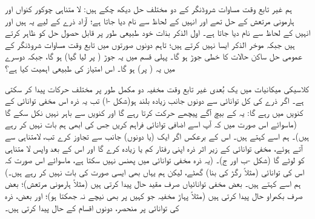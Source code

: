  ہم غیر تابع وقت مساوات شروڈنگر کے دو مختلف حل دیکھ چکے ہیں: لا متناہی چوکور کنواں اور ہارمونی مرتعش کے حل  تھے اور انہیں   کے لحاظ سے نام دیا جاتا ہے؛ آزاد ذرے کے لیے یہ  ہیں اور انہیں   کے لحاظ سے نام دیا جاتا ہے۔ اول الذکر بذات خود طبیعی طور پر قابل حصول حل کو ظاہر کرتے ہیں جبکہ موخر الذکر ایسا نہیں کرتے ہیں؛ تاہم دونوں صورتوں میں تابع وقت مساوات شروڈنگر کے عمومی حل ساکن حالات کا خطی جوڑ ہو گا۔ پہلی قسم میں یہ جوڑ ( پر لیا گیا)  ہو گا، جبکہ دوسرے میں یہ ( پر)  ہو گا۔ اس امتیاز کی طبیعی اہمیت کیا ہے؟

 کلاسیکی میکانیات میں یک بُعدی غیر تابع وقت مخفیہ دو مکمل طور پر مختلف حرکات پیدا کر سکتی ہے۔ اگر  ذرے کی کل توانائی  سے دونوں جانب زیادہ بلند ہو(شکل -ا) تب یہ ذرہ اس مخفی توانائی کے کنویں میں  رہے گا: یہ  کے بیچ آگے پیچھے حرکت کرتا رہے گا اور کنویں سے باہر نہیں نکل سکے گا (ماسوائے اس صورت میں کہ آپ اسے اضافی توانائی فراہم کریں جس کی ابھی ہم بات نہیں کر رہے ہیں)۔ ہم اسے  کہتے ہیں۔ اس کے برعکس اگر  ایک (یا دونوں) جانب  سے تجاوز کرے تب، لامتناہی سے آتے ہوئے، مخفی توانائی کے زیر اثر ذرہ اپنی رفتار کم یا زیادہ کرے گا اور اس کے بعد واپس لا متناہی کو لوٹے گا (شکل -ب اور ج)۔ (یہ ذرہ مخفی توانائی میں پھنس نہیں سکتا ہے، ماسوائے اس صورت کہ اس کی توانائی (مثلاً رگڑ کی بنا) گھٹے، لیکن ہم یہاں بھی ایسی صورت کی بات نہیں کر رہے ہیں۔) ہم اسے  کہتے ہیں۔ بعض مخفی توانائیاں صرف مقید حال پیدا کرتی ہیں (مثلاً ہارمونی مرتعش)؛ بعض صرف بکھراو حال پیدا کرتی ہیں (مثلاً پہاڑ مخفیہ جو کہیں پر بھی نیچے نہ جھکتا ہو)؛ اور بعض، ذرہ کی توانائی پر منحصر، دونوں اقسام کے حال پیدا کرتی ہیں۔
